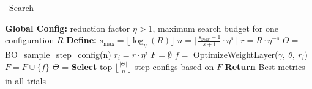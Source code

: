 


\begin{algorithm}[H]
\caption{\sysname\ Search}
\label{alg:hb}
\begin{algorithmic}[1]
\STATE \textbf{Global Config:} reduction factor $\eta > 1$, maximum search budget for one configuration $R$
\STATE \textbf{Define:} $s_{\text{max}} = \lfloor \log_\eta(R) \rfloor$ 
        \STATE $n = \lceil \frac{s_{max}+1}{s+1}\cdot \eta^s \rceil$ 
        \STATE $r = R \cdot \eta^{-s}$ 
        \STATE $\Theta = $ BO\_sample\_step\_config(n) 
            \STATE $r_i = r \cdot \eta^i$ 
            \STATE $F = \emptyset$
            \FOR{$\theta \in \Theta$} %
                \STATE $f = $ OptimizeWeightLayer($\gamma,\ \theta,\ r_i$)
                \STATE $F = F \cup \{f\}$
            \ENDFOR
            \STATE $\Theta$ = \textbf{Select} top $\lfloor \frac{|\Theta|}{\eta}\rfloor$ step configs based on $F$
        \ENDFOR
    \ENDFOR
\STATE \textbf{Return} Best metrics in all trials
\ENDFUNCTION

\end{algorithmic}
\end{algorithm}